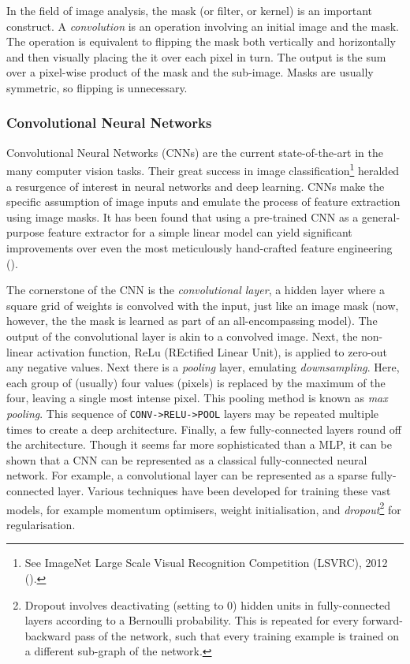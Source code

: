 \documentclass[11pt]{amsart}
\begin{document}
In the field of image analysis, the mask (or filter, or kernel) is an important construct. A \emph{convolution} is an operation involving an initial image and the mask. The operation is equivalent to flipping the mask both vertically and horizontally and then visually placing the it over each pixel in turn. The output is the sum over a pixel-wise product of the mask and the sub-image. Masks are usually symmetric, so flipping is unnecessary.

\subsubsection{Convolutional Neural Networks}

Convolutional Neural Networks (CNNs) are the current state-of-the-art in the many computer vision tasks. Their great success in image classification\footnote{See ImageNet Large Scale Visual Recognition Competition (LSVRC), 2012 (\cite{krizhevsky2012imagenet}).} heralded a resurgence of interest in neural networks and deep learning. CNNs make the specific assumption of image inputs and emulate the process of feature extraction using image masks. It has been found that using a pre-trained CNN as a general-purpose feature extractor for a simple linear model can yield significant improvements over even the most meticulously hand-crafted feature engineering (\cite{sharif2014cnn}).

The cornerstone of the CNN is the \emph{convolutional layer}, a hidden layer where a square grid of weights is convolved with the input, just like an image mask (now, however, the the mask is learned as part of an all-encompassing model). The output of the convolutional layer is akin to a convolved image. Next, the non-linear activation function, ReLu (REctified Linear Unit), is applied to zero-out any negative values. Next there is a \emph{pooling} layer, emulating \emph{downsampling}. Here, each group of (usually) four values (pixels) is replaced by the maximum of the four, leaving a single most intense pixel. This pooling method is known as \emph{max pooling}. This sequence of \texttt{CONV->RELU->POOL} layers may be repeated multiple times to create a deep architecture. Finally, a few fully-connected layers round off the architecture. Though it seems far more sophisticated than a MLP, it can be shown that a CNN can be represented as a classical fully-connected neural network. For example, a convolutional layer can be represented as a sparse fully-connected layer. Various techniques have been developed for training these vast models, for example momentum optimisers, weight initialisation, and \emph{dropout}\footnote{Dropout involves deactivating (setting to $0$) hidden units in fully-connected layers according to a Bernoulli probability. This is repeated for every forward-backward pass of the network, such that every training example is trained on a different sub-graph of the network.} for regularisation.
\end{document}
